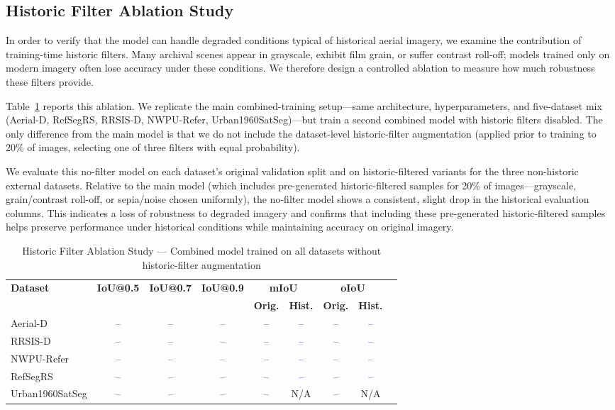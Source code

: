 \subsection{Historic Filter Ablation Study}
\label{subsec:historic_ablation}

In order to verify that the model can handle degraded conditions typical of historical aerial imagery, we examine the contribution of training-time historic filters. Many archival scenes appear in grayscale, exhibit film grain, or suffer contrast roll-off; models trained only on modern imagery often lose accuracy under these conditions. We therefore design a controlled ablation to measure how much robustness these filters provide.

Table~\ref{tab:historic_ablation_results} reports this ablation. We replicate the main combined-training setup—same architecture, hyperparameters, and five-dataset mix (Aerial-D, RefSegRS, RRSIS-D, NWPU-Refer, Urban1960SatSeg)—but train a second combined model with historic filters disabled. The only difference from the main model is that we do not include the dataset-level historic-filter augmentation (applied prior to training to 20\% of images, selecting one of three filters with equal probability).

We evaluate this no-filter model on each dataset’s original validation split and on historic-filtered variants for the three non-historic external datasets. Relative to the main model (which includes pre-generated historic-filtered samples for 20\% of images—grayscale, grain/contrast roll-off, or sepia/noise chosen uniformly), the no-filter model shows a consistent, slight drop in the historical evaluation columns. This indicates a loss of robustness to degraded imagery and confirms that including these pre-generated historic-filtered samples helps preserve performance under historical conditions while maintaining accuracy on original imagery.

\begin{table}[t]
\centering
\caption{Historic Filter Ablation Study — Combined model trained on all datasets without historic-filter augmentation}
\label{tab:historic_ablation_results}
\begin{tabular}{@{}lcccccccc@{}}
\toprule
\textbf{Dataset} & \textbf{IoU@0.5} & \textbf{IoU@0.7} & \textbf{IoU@0.9} & \multicolumn{2}{c}{\textbf{mIoU}} & \multicolumn{2}{c}{\textbf{oIoU}} \\
\cmidrule(lr){5-6} \cmidrule(lr){7-8}
 & & & & \textbf{Orig.} & \textbf{Hist.} & \textbf{Orig.} & \textbf{Hist.} \\
\midrule
Aerial-D & -- & -- & -- & -- & \textcolor{blue}{--} & -- & \textcolor{blue}{--} \\
RRSIS-D & -- & -- & -- & -- & \textcolor{blue}{--} & -- & \textcolor{blue}{--} \\
NWPU-Refer & -- & -- & -- & -- & \textcolor{blue}{--} & -- & \textcolor{blue}{--} \\
RefSegRS & -- & -- & -- & -- & \textcolor{blue}{--} & -- & \textcolor{blue}{--} \\
Urban1960SatSeg & -- & -- & -- & -- & N/A & -- & N/A \\
\bottomrule
\end{tabular}
\end{table}

